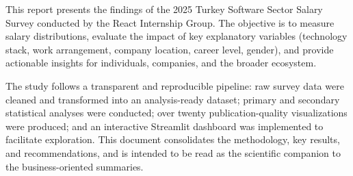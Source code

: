 This report presents the findings of the 2025 Turkey Software Sector Salary Survey conducted by the React Internship Group. The objective is to measure salary distributions, evaluate the impact of key explanatory variables (technology stack, work arrangement, company location, career level, gender), and provide actionable insights for individuals, companies, and the broader ecosystem.

The study follows a transparent and reproducible pipeline: raw survey data were cleaned and transformed into an analysis-ready dataset; primary and secondary statistical analyses were conducted; over twenty publication-quality visualizations were produced; and an interactive Streamlit dashboard was implemented to facilitate exploration. This document consolidates the methodology, key results, and recommendations, and is intended to be read as the scientific companion to the business-oriented summaries.
